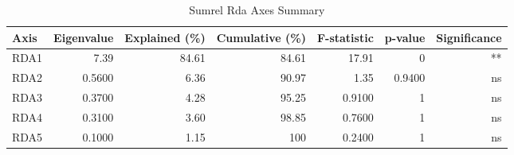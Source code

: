 \begin{table}[htbp]
  \centering
  \caption{Sumrel Rda Axes Summary}
  \label{tab:ref_threshold_sensitivity_SumRel_rda_axes_summary}
  \small
  \begin{tabular}{lrrrrrr}
    \toprule
    Axis & Eigenvalue & Explained (\%) & Cumulative (\%) & F-statistic & p-value & Significance \\
    \midrule
    RDA1 & 7.39 & 84.61 & 84.61 & 17.91 & 0 & ** \\
    RDA2 & 0.5600 & 6.36 & 90.97 & 1.35 & 0.9400 & ns \\
    RDA3 & 0.3700 & 4.28 & 95.25 & 0.9100 & 1 & ns \\
    RDA4 & 0.3100 & 3.60 & 98.85 & 0.7600 & 1 & ns \\
    RDA5 & 0.1000 & 1.15 & 100 & 0.2400 & 1 & ns \\
    \bottomrule
  \end{tabular}
\end{table}

